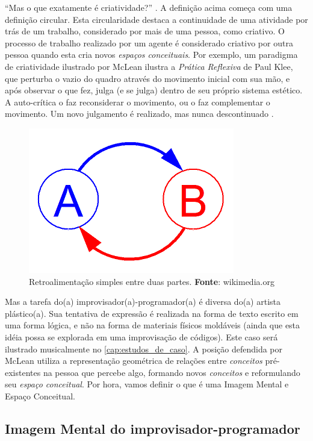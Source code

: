 ``Mas o que exatamente é criatividade?'' \cite[p.~117--127]{McLean2011}. A definição acima começa com uma definição circular. Esta circularidade destaca a continuidade de uma atividade por trás de um trabalho, considerado por mais de uma pessoa, como criativo.  O processo de trabalho realizado por um agente é considerado criativo por outra pessoa quando esta cria novos \emph{espaços conceituais}. Por exemplo, um paradigma de criatividade ilustrado por McLean ilustra a \emph{Prática Reflexiva} de Paul Klee, que perturba o vazio do quadro através do movimento inicial com sua mão, e após observar o que fez, julga (e se julga) dentro de seu próprio sistema estético. A auto-crítica o faz reconsiderar o movimento, ou o faz complementar o movimento. Um novo julgamento é realizado, mas nunca descontinuado .

  \begin{figure}[!h]
    \centering
    \includegraphics[scale=0.5]{imagens/Simple_Feedback_02.png}
    \caption{Retroalimentação simples entre duas partes. \textbf{Fonte}: wikimedia.org}
    \label{fig:feedback}
  \end{figure}

Mas a tarefa do(a) improvisador(a)-programador(a) é diversa do(a) artista plástico(a). Sua tentativa de expressão é realizada na forma de texto escrito em uma forma lógica, e não na forma de materiais físicos moldáveis (ainda que esta idéia possa se explorada em uma improvisação de códigos). Este caso será ilustrado musicalmente no \autoref{cap:estudos_de_caso}. A posição defendida por McLean utiliza a representação geométrica de relações entre \emph{conceitos} pré-existentes na pessoa que percebe algo, formando novos \emph{conceitos} e reformulando seu \emph{espaço conceitual}. Por hora, vamos definir o que é uma Imagem Mental e Espaço Conceitual.

\subsection{Imagem Mental do improvisador-programador}\label{sec:imagem_mental}

